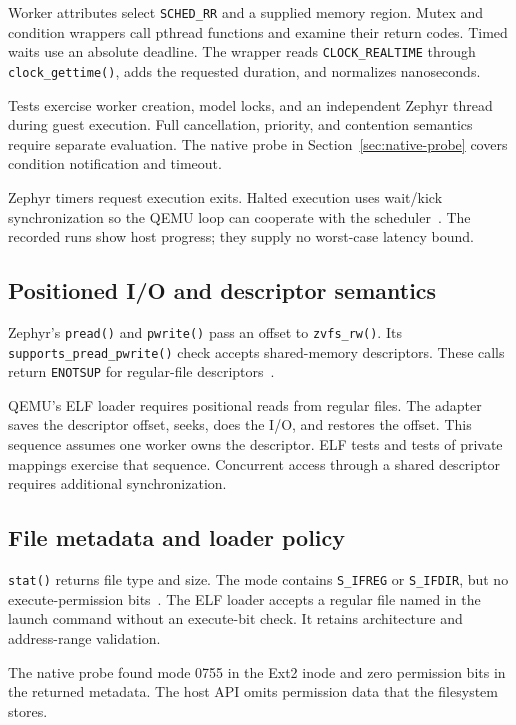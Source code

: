 \documentclass[10pt,a4paper,twocolumn]{article}
\newcommand{\code}[1]{\texttt{#1}}
\begin{document}
Worker attributes select \code{SCHED\_RR} and a supplied memory region.
Mutex and condition wrappers call pthread functions and examine their return
codes. Timed waits use an absolute deadline. The wrapper reads
\code{CLOCK\_REALTIME} through \code{clock\_gettime()}, adds the requested
duration, and normalizes nanoseconds.

Tests exercise worker creation, model locks, and an independent Zephyr thread
during guest execution. Full cancellation, priority, and contention semantics
require separate evaluation. The native probe in
Section~\ref{sec:native-probe} covers condition notification and timeout.

Zephyr timers request execution exits. Halted execution uses wait/kick
synchronization so the QEMU loop can cooperate with the
scheduler~\cite{scheduling}. The recorded runs show host progress; they
supply no worst-case latency bound.

\subsection{Positioned I/O and descriptor semantics}
\label{sec:positioned-io}

Zephyr's \code{pread()} and \code{pwrite()} pass an offset to
\code{zvfs\_rw()}. Its \code{supports\_pread\_pwrite()} check accepts
shared-memory descriptors. These calls return \code{ENOTSUP} for regular-file
descriptors~\cite{device-io,zvfs}.

QEMU's ELF loader requires positional reads from regular files. The adapter
saves the descriptor offset, seeks, does the I/O, and restores the offset.
This sequence assumes one worker owns the descriptor. ELF tests and tests of
private mappings exercise that sequence. Concurrent access through a shared descriptor
requires additional synchronization.

\subsection{File metadata and loader policy}

\code{stat()} returns file type and size. The mode contains
\code{S\_IFREG} or \code{S\_IFDIR}, but no execute-permission
bits~\cite{zephyr-stat}. The ELF loader accepts a regular file
named in the launch command without an execute-bit check. It retains
architecture and address-range validation.

The native probe found mode 0755 in the Ext2 inode and zero permission bits
in the returned metadata. The host API omits permission data that the
filesystem stores.
\end{document}
